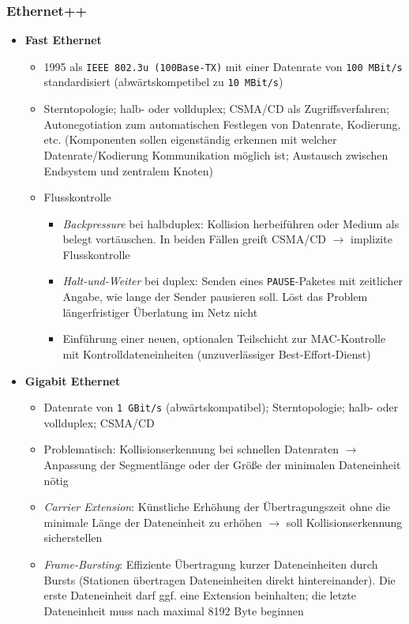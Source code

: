 \subsubsection{Ethernet++}
\begin{itemize}
	\item \textbf{Fast Ethernet}
	\begin{itemize}
		\item 1995 als \texttt{IEEE 802.3u (100Base-TX)} mit einer Datenrate von \texttt{100 MBit/s} standardisiert (abwärtskompetibel zu \texttt{10 MBit/s})
		\item Sterntopologie; halb- oder vollduplex; CSMA/CD als Zugriffsverfahren; Autonegotiation zum automatischen Festlegen von Datenrate, Kodierung, etc. (Komponenten sollen eigenständig erkennen mit welcher Datenrate/Kodierung Kommunikation möglich ist; Austausch zwischen Endsystem und zentralem Knoten)
		\item Flusskontrolle
		\begin{itemize}
			\item \textit{Backpressure} bei halbduplex: Kollision herbeiführen oder Medium als belegt vortäuschen. In beiden Fällen greift CSMA/CD \(\rightarrow\) implizite Flusskontrolle
			\item \textit{Halt-und-Weiter} bei duplex: Senden eines \texttt{PAUSE}-Paketes mit zeitlicher Angabe, wie lange der Sender pausieren soll. Löst das Problem längerfristiger Überlatung im Netz nicht
			\item Einführung einer neuen, optionalen Teilschicht zur MAC-Kontrolle mit Kontrolldateneinheiten (unzuverlässiger Best-Effort-Dienst)
		\end{itemize}
	\end{itemize}
	\item \textbf{Gigabit Ethernet}
	\begin{itemize}
		\item Datenrate von \texttt{1 GBit/s} (abwärtskompatibel); Sterntopologie; halb- oder vollduplex; CSMA/CD
		\item Problematisch: Kollisionserkennung bei schnellen Datenraten \(\rightarrow\) Anpassung der Segmentlänge oder der Größe der minimalen Dateneinheit nötig
		\item \textit{Carrier Extension}: Künstliche Erhöhung der Übertragungszeit ohne die minimale Länge der Dateneinheit zu erhöhen \(\rightarrow\) soll Kollisionserkennung sicherstellen
		\item \textit{Frame-Bursting}: Effiziente Übertragung kurzer Dateneinheiten durch Bursts (Stationen übertragen Dateneinheiten direkt hintereinander). Die erste Dateneinheit darf ggf. eine Extension beinhalten; die letzte Dateneinheit muss nach maximal 8192 Byte beginnen

\end{itemize}
\end{itemize}
